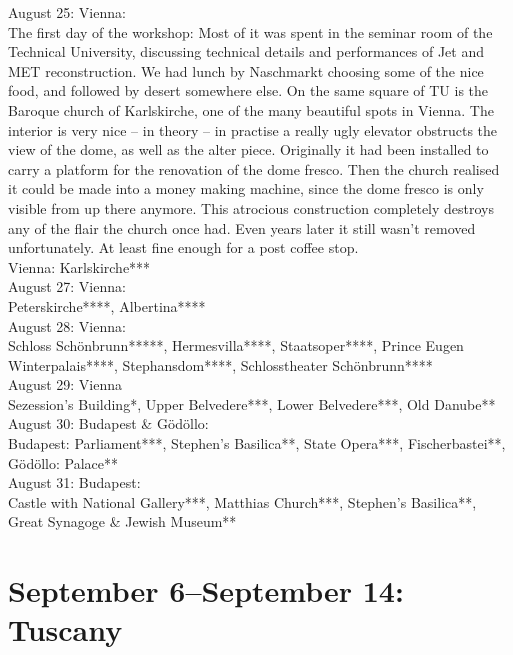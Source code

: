 August 25: Vienna:\\
The first day of the workshop: Most of it was spent in the seminar room of the Technical University, discussing technical details and performances of Jet and MET reconstruction. We had lunch by Naschmarkt choosing some of the nice food, and followed by desert somewhere else. On the same square of TU is the Baroque church of Karlskirche, one of the many beautiful spots in Vienna. The interior is very nice -- in theory -- in practise a really ugly elevator obstructs the view of the dome, as well as the alter piece. Originally it had been installed to carry a platform for the renovation of the dome fresco. Then the church realised it could be made into a money making machine, since the dome fresco is only visible from up there anymore. This atrocious construction completely destroys any of the flair the church once had. Even years later it still wasn't removed unfortunately. At least fine enough for a post coffee stop.\\

Vienna: Karlskirche***\\

August 27: Vienna:\\
Peterskirche****, Albertina****\\

August 28: Vienna:\\
Schloss Sch\"onbrunn*****, Hermesvilla****, Staatsoper****, Prince Eugen Winterpalais****, Stephansdom****, Schlosstheater Sch\"onbrunn****\\

August 29: Vienna\\
Sezession's Building*, Upper Belvedere***, Lower Belvedere***, Old Danube**\\

August 30: Budapest \& G\"od\"ollo:\\
Budapest: Parliament***, Stephen's Basilica**, State Opera***, Fischerbastei**, G\"od\"ollo: Palace**\\

August 31: Budapest:\\
Castle with National Gallery***, Matthias Church***, Stephen's Basilica**, Great Synagoge \& Jewish Museum**

\section{September 6--September 14: Tuscany}
\label{Tuscany2014}

